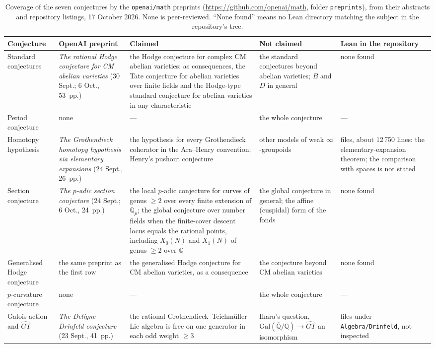 \documentclass[11pt,a4paper]{article}
\begin{document}
\begin{table}[h]
\footnotesize\setlength{\tabcolsep}{3pt}
\begin{tabularx}{\textwidth}{>{\raggedright}p{2cm} >{\raggedright}p{2.5cm} >{\raggedright}X >{\raggedright}p{2.6cm} >{\raggedright\arraybackslash}p{2.4cm}}
\toprule
Conjecture & OpenAI preprint & Claimed & Not claimed & Lean in the repository \\
\midrule
Standard conjectures & \emph{The rational Hodge conjecture for CM abelian varieties} (30 Sept.; 6 Oct., 53~pp.) & the Hodge conjecture for complex CM abelian varieties; as consequences, the Tate conjecture for abelian varieties over finite fields and the Hodge-type standard conjecture for abelian varieties in any characteristic & the standard conjectures beyond abelian varieties; $B$ and $D$ in general & none found \\
Period conjecture & none & --- & the whole conjecture & --- \\
Homotopy hypothesis & \emph{The Grothendieck homotopy hypothesis via elementary expansions} (24 Sept., 26~pp.) & the hypothesis for every Grothendieck coherator in the Ara--Henry convention; Henry's pushout conjecture & other models of weak $\infty$-groupoids & 58 files, about 12\,750 lines: the elementary-expansion theorem; the comparison with spaces is not stated \\
Section conjecture & \emph{The $p$-adic section conjecture} (24 Sept.; 6 Oct., 24~pp.) & the local $p$-adic conjecture for curves of genus $\geq 2$ over every finite extension of $\mathbb Q_p$; the global conjecture over number fields when the finite-cover descent locus equals the rational points, including $X_0(N)$ and $X_1(N)$ of genus $\geq 2$ over $\mathbb Q$ & the global conjecture in general; the affine (cuspidal) form of the fonds & none found \\
Generalised Hodge conjecture & the same preprint as the first row & the generalised Hodge conjecture for CM abelian varieties, as a consequence & the conjecture beyond CM abelian varieties & none found \\
$p$-curvature conjecture & none & --- & the whole conjecture & --- \\
Galois action and $\widehat{GT}$ & \emph{The Deligne--Drinfeld conjecture} (23 Sept., 41~pp.) & the rational Grothendieck--Teichmüller Lie algebra is free on one generator in each odd weight $\geq 3$ & Ihara's question, $\mathrm{Gal}(\overline{\mathbb Q}/\mathbb Q) \to \widehat{GT}$ an isomorphism & 21 files under \texttt{Algebra/\allowbreak Drinfeld}, not inspected \\
\bottomrule
\end{tabularx}
\caption{Coverage of the seven conjectures by the \texttt{openai/math} preprints (\url{https://github.com/openai/math}, folder \texttt{preprints}), from their abstracts and repository listings, 17 October 2026. None is peer-reviewed. ``None found'' means no Lean directory matching the subject in the repository's tree.}
\label{tab:openai}
\end{table}
\end{document}
